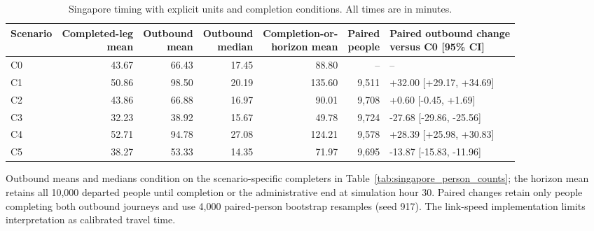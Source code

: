 \begin{table}[pos=htbp]
\centering\footnotesize
\caption{Singapore timing with explicit units and completion conditions. All times are in minutes.}
\label{tab:singapore_person_time}
\setlength{\tabcolsep}{3pt}
\renewcommand{\arraystretch}{1.15}
\begin{tabular}{@{}lrrrrrl@{}}
\toprule
Scenario & \shortstack{Completed-leg\\mean} & \shortstack{Outbound\\mean} & \shortstack{Outbound\\median} & \shortstack{Completion-or-\\horizon mean} & \shortstack{Paired\\people} & \shortstack{Paired outbound change\\versus C0 [95\% CI]} \\
\midrule
C0 & 43.67 & 66.43 & 17.45 & 88.80 & -- & -- \\
C1 & 50.86 & 98.50 & 20.19 & 135.60 & 9,511 & +32.00 [+29.17, +34.69] \\
C2 & 43.86 & 66.88 & 16.97 & 90.01 & 9,708 & +0.60 [-0.45, +1.69] \\
C3 & 32.23 & 38.92 & 15.67 & 49.78 & 9,724 & -27.68 [-29.86, -25.56] \\
C4 & 52.71 & 94.78 & 27.08 & 124.21 & 9,578 & +28.39 [+25.98, +30.83] \\
C5 & 38.27 & 53.33 & 14.35 & 71.97 & 9,695 & -13.87 [-15.83, -11.96] \\
\bottomrule
\end{tabular}
\par\smallskip\begin{minipage}{0.98\textwidth}\footnotesize Outbound means and medians condition on the scenario-specific completers in Table~\ref{tab:singapore_person_counts}; the horizon mean retains all 10,000 departed people until completion or the administrative end at simulation hour 30. Paired changes retain only people completing both outbound journeys and use 4,000 paired-person bootstrap resamples (seed 917). The link-speed implementation limits interpretation as calibrated travel time.\end{minipage}
\end{table}
